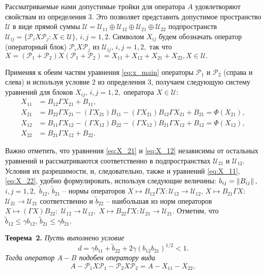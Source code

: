Рассматриваемые нами допустимые тройки для оператора $A$ удовлетворяют свойствам из определения 3. Это позволяет представить допустимое пространство $\mathcal{U}$ в виде прямой суммы $\mathcal{U} = \mathcal{U}_{11} \oplus \mathcal{U}_{12} \oplus \mathcal{U}_{21} \oplus \mathcal{U}_{22}$ подпространств $\mathcal{U}_{ij} = \{ \mathcal{P}_i X \mathcal{P}_j \colon X \in \mathcal{U} \}, \, i,j = 1,2.$ Символом $X_{ij}$ будем обозначать оператор (операторный блок) $\mathcal{P}_i X \mathcal{P}_j$ из $\mathcal{U}_{ij}, \, i,j = 1,2,$ так что $X = (\mathcal{P}_1 + \mathcal{P}_2) X (\mathcal{P}_1 + \mathcal{P}_2) = X_{11} + X_{12} + X_{21} + X_{22}, X \in \mathcal{U}.$

Применяя к обеим частям уравнения \eqref{eq:x_main} операторы $\mathcal{P}_1$ и $\mathcal{P}_2$ (справа и слева) и используя условие 2 из определения 3, получаем следующую систему уравнений для блоков $X_{ij}, \, i,j = 1,2,$ оператора $X \in \mathcal{U}:$
\begin{align}
X_{11} &= B_{12}\Gamma X_{21} + B_{11},  \label{eq:X_11} \\
X_{21} &= B_{22}\Gamma X_{21} - (\Gamma X_{21})B_{11} - (\Gamma X_{21})B_{12}\Gamma X_{21} + B_{21} = \Phi(X_{21}),  \label{eq:X_21} \\
X_{12} &= B_{11}\Gamma X_{12} - (\Gamma X_{12})B_{22} - (\Gamma X_{12})B_{21}\Gamma X_{12} + B_{12} = \Phi(X_{12}), \label{eq:X_12} \\
X_{22} &= B_{21}\Gamma X_{12} + B_{22}. \label{eq:X_22}
\end{align}

Важно отметить, что уравнения \eqref{eq:X_21} и \eqref{eq:X_12} независимы от остальных уравнений и рассматриваются  соответственно в подпространствах $\mathcal{U}_{21}$ и $\mathcal{U}_{12}.$ Условия их разрешимости, и, следовательно, также и уравнений \eqref{eq:X_11}, \eqref{eq:X_22}, удобно формулировать, используя следующие величины: $b_{ij} = \left\|B_{ij}\right\|, \,$ ${i,j = 1,2,}$ $\tilde{b}_{12}, \, \tilde{b}_{21}$ -- нормы операторов $X \mapsto B_{12}\Gamma X \colon \mathcal{U}_{12} \to \mathcal{U}_{12}, \, X \mapsto B_{21}\Gamma X \colon$\! ${\mathcal{U}_{21} \to \mathcal{U}_{21}}$ соответственно и $\tilde{b}_{22}$ -- наибольшая из норм операторов $X \mapsto (\Gamma X)B_{22} \colon$ ${\mathcal{U}_{12} \to \mathcal{U}_{12},}$ $X \mapsto B_{22}\Gamma X \colon \mathcal{U}_{21} \to \mathcal{U}_{21}.$ Отметим, что $\tilde{b}_{12} \leqslant \gamma b_{12}, \, \tilde{b}_{21} \leqslant \gamma b_{21}.$

\textbf{Теорема~2.}
{ \it Пусть выполнено условие
\begin{equation}
d = \gamma b_{11} + \tilde{b}_{22} + 2\gamma (b_{12}b_{21})^{1/2} < 1.
\label{cond_of_simil}
\end{equation}
Тогда оператор $A - B$ подобен оператору вида
\begin{equation*}
A - \mathcal{P}_1 X \mathcal{P}_1 - \mathcal{P}_2 X \mathcal{P}_2 = A - X_{11} - X_{22},
\end{equation*}
}  